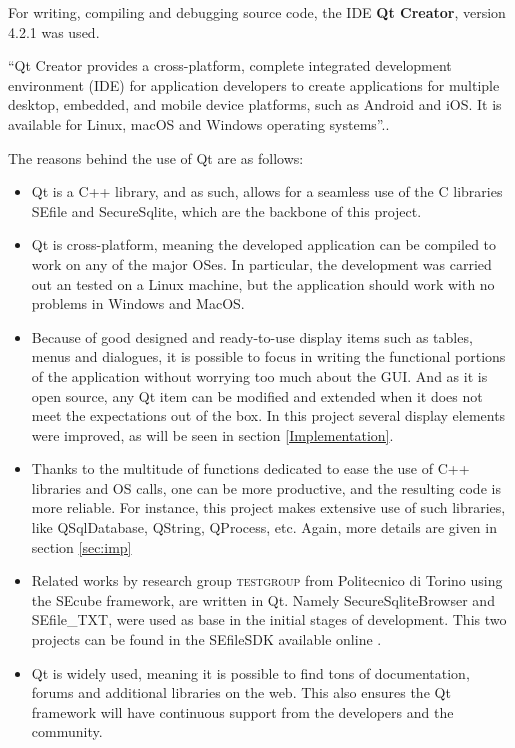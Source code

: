 For writing, compiling and debugging source code, the IDE \textbf{Qt Creator}, version 4.2.1 was used.

``Qt Creator provides a cross-platform, complete integrated development environment (IDE) for application developers to create applications for multiple desktop, embedded, and mobile device platforms, such as Android and iOS. It is available for Linux, macOS and Windows operating systems''.\cite{QtC}.

\vspace{5pt}
The reasons behind the use of Qt are as follows:

\begin{itemize}
\item Qt is a C++ library, and as such, allows for a seamless use of the C libraries SEfile and SecureSqlite, which are the backbone of this project.

\item Qt is cross-platform, meaning the developed application can be compiled to work on any of the major OSes. In particular, the development was carried out an tested on a Linux machine, but the application should work with no problems in Windows and MacOS. 

\item Because of good designed and ready-to-use display items such as tables, menus and dialogues, it is possible to focus in writing the functional portions of the application without worrying too much about the GUI. And as it is open source, any Qt item can be modified and extended when it does not meet the expectations out of the box. In this project several display elements were improved, as will be seen in section \ref{Implementation}.

\item Thanks to the multitude of functions dedicated to ease the use of C++ libraries and OS calls, one can be more productive, and the resulting code is more reliable. For instance, this project makes extensive use of such libraries, like QSqlDatabase, QString, QProcess, etc. Again, more details are given in section \ref{sec:imp}

\item Related works by research group \textsc{testgroup} from Politecnico di Torino using the SEcube framework, are written in Qt. Namely SecureSqliteBrowser and SEfile\_TXT, were used as base in the initial stages of development. This two projects can be found in the SEfileSDK available online \cite{SEcubeRes}.

\item Qt is widely used, meaning it is possible to find tons of documentation, forums and additional libraries on the web. This also ensures the Qt framework will have continuous support from the developers and the community.

\end{itemize}



